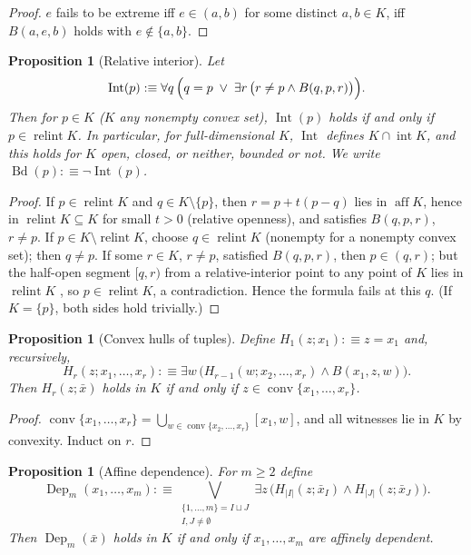 \documentclass[11pt]{amsart}
\newtheorem{proposition}[theorem]{Proposition}
\theoremstyle{definition}
\newcommand{\Int}{\operatorname{Int}}
\newcommand{\Bd}{\operatorname{Bd}}
\newcommand{\Dep}{\operatorname{Dep}}
\newcommand{\aff}{\operatorname{aff}}
\newcommand{\conv}{\operatorname{conv}}
\newcommand{\interior}{\operatorname{int}}
\newcommand{\relint}{\operatorname{relint}}
\begin{document}
\begin{proof}
$e$ fails to be extreme iff $e\in(a,b)$ for some distinct $a,b\in K$, iff
$B(a,e,b)$ holds with $e\notin\{a,b\}$.
\end{proof}

\begin{proposition}[Relative interior]\label{prop:interior}
Let
\[
\Int(p):\equiv\forall q\,\Bigl(q=p\;\vee\;\exists r\,\bigl(r\ne p\wedge
B(q,p,r)\bigr)\Bigr).
\]
Then for $p\in K$ ($K$ any nonempty convex set), $\Int(p)$ holds if and only
if $p\in\relint K$. In particular, for full-dimensional $K$, $\Int$ defines
$K\cap\interior K$, and this holds for $K$ open, closed, or neither, bounded
or not. We write $\Bd(p):\equiv\neg\Int(p)$.
\end{proposition}

\begin{proof}
If $p\in\relint K$ and $q\in K\setminus\{p\}$, then $r=p+t(p-q)$ lies in
$\aff K$, hence in $\relint K\subseteq K$ for small $t>0$ (relative
openness), and satisfies $B(q,p,r)$, $r\ne p$. If
$p\in K\setminus\relint K$, choose $q\in\relint K$ (nonempty for a nonempty
convex set); then $q\ne p$. If some $r\in K$, $r\ne p$, satisfied
$B(q,p,r)$, then $p\in(q,r)$; but the half-open segment $[q,r)$ from a
relative-interior point to any point of $K$ lies in $\relint K$
\cite[Lemma~1.1.9]{Schneider14}, so $p\in\relint K$, a contradiction. Hence
the formula fails at this $q$. (If $K=\{p\}$, both sides hold trivially.)
\end{proof}

\begin{proposition}[Convex hulls of tuples]\label{prop:hull}
Define $H_1(z;x_1):\equiv z=x_1$ and, recursively,
\[
H_r(z;x_1,\dots,x_r):\equiv\exists w\,\bigl(H_{r-1}(w;x_2,\dots,x_r)\wedge
B(x_1,z,w)\bigr).
\]
Then $H_r(z;\bar x)$ holds in $K$ if and only if
$z\in\conv\{x_1,\dots,x_r\}$.
\end{proposition}

\begin{proof}
$\conv\{x_1,\dots,x_r\}=\bigcup_{w\in\conv\{x_2,\dots,x_r\}}[x_1,w]$, and all
witnesses lie in $K$ by convexity. Induct on $r$.
\end{proof}

\begin{proposition}[Affine dependence]\label{prop:dep}
For $m\ge2$ define
\[
\Dep_m(x_1,\dots,x_m):\equiv
\bigvee_{\substack{\{1,\dots,m\}=I\sqcup J\\ I,J\ne\emptyset}}
\exists z\,\bigl(H_{|I|}(z;\bar x_I)\wedge H_{|J|}(z;\bar x_J)\bigr).
\]
Then $\Dep_m(\bar x)$ holds in $K$ if and only if $x_1,\dots,x_m$ are
affinely dependent.
\end{proposition}
\end{document}
